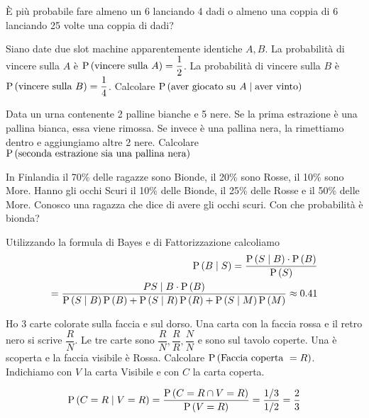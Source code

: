 
\begin{exrc}
    È più probabile fare almeno un 6 lanciando 4 dadi o almeno una coppia di 6 lanciando 25 volte una coppia di dadi?
\end{exrc}

\begin{exrc}
    Siano date due slot machine apparentemente identiche $ A,B $. La probabilità di vincere sulla $ A $ è $ \text{P}\left(\text{vincere sulla }A\right) = \dfrac{1}{2}$. La probabilità di vincere sulla $ B $ è $ \text{P}\left(\text{vincere sulla }B\right) = \dfrac{1}{4}$. Calcolare $ \text{P}\left(\text{aver giocato su }A \mid \text{aver vinto}\right) $
\end{exrc}

\begin{exrc}
    Data un urna contenente 2 palline bianche e 5 nere. Se la prima estrazione è una pallina bianca, essa viene rimossa. Se invece è una pallina nera, la rimettiamo dentro e aggiungiamo altre 2 nere. Calcolare $ \text{P}\left(\text{seconda estrazione sia una pallina nera}\right) $
\end{exrc}

\begin{exrc}
    In Finlandia il 70\% delle ragazze sono Bionde, il 20\% sono Rosse, il 10\% sono More. Hanno gli occhi Scuri il 10\% delle Bionde, il 25\% delle Rosse e il 50\% delle More.
    Conosco una ragazza che dice di avere gli occhi scuri. Con che probabilità è bionda?
    
    Utilizzando la formula di Bayes e di Fattorizzazione calcoliamo
    \begin{equation*}
    \begin{aligned}
    \text{P}\left(B \mid S\right) = \dfrac{\text{P}\left(S \mid B\right) \cdot \text{P}\left(B\right)}{\text{P}\left(S\right)} \\
    = \dfrac{P{S \mid B} \cdot \text{P}\left(B\right)}{\text{P}\left(S \mid B\right) \text{P}\left(B\right) + \text{P}\left(S \mid R\right) \text{P}\left(R\right) + \text{P}\left(S \mid M\right) \text{P}\left(M\right)} \approx 0.41
    \end{aligned}
    \end{equation*}
\end{exrc}

\begin{exrc}
    Ho 3 carte colorate sulla faccia e sul dorso. Una carta con la faccia rossa e il retro nero si scrive $ \dfrac{R}{N} $. Le tre carte sono $ \dfrac{R}{N}, \dfrac{R}{R}, \dfrac{N}{N} $ e sono sul tavolo coperte. Una è scoperta e la faccia visibile è Rossa. Calcolare $ \text{P}\left(\text{Faccia coperta } = R\right) $. Indichiamo con $ V $ la carta Visibile e con $ C $ la carta coperta.
    
    \begin{equation*}
    \begin{aligned}
    \text{P}\left(C = R \mid V = R\right) = \dfrac{\text{P}\left(C = R \cap V = R\right)}{\text{P}\left(V = R\right)} = \dfrac{1/3}{1/2} = \dfrac{2}{3}
    \end{aligned} 
    \end{equation*}
\end{exrc}



